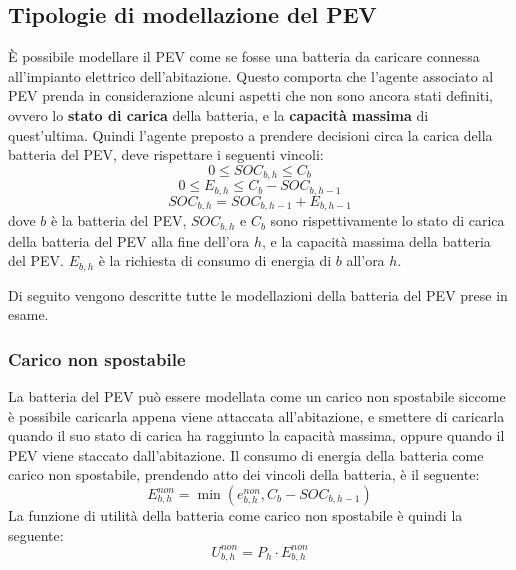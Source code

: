 \documentclass[italian, Lau, oneside]{sapthesis}
\begin{document}
\subsection{Tipologie di modellazione del PEV}
\label{subsec:tipmod}
È possibile modellare il PEV come se fosse una batteria da caricare connessa all'impianto elettrico dell'abitazione. Questo comporta che l'agente associato al PEV prenda in considerazione alcuni aspetti che non sono ancora stati definiti, ovvero lo \textbf{stato di carica} della batteria, e la \textbf{capacità massima} di quest'ultima. Quindi l'agente preposto a prendere decisioni circa la carica della batteria del PEV, deve rispettare i seguenti vincoli:
\begin{equation}
\label{eq:vincolo1}
0 \leq SOC_{b,h} \leq C_b
\end{equation}
\begin{equation}
\label{eq:vincolo2}
0 \leq E_{b,h} \leq C_b - SOC_{b,h-1}
\end{equation}
\begin{equation}
\label{eq:vincolo3}
SOC_{b,h} = SOC_{b,h-1} + E_{b,h-1}
\end{equation}
dove $b$ è la batteria del PEV, $SOC_{b,h}$ e $C_b$ sono rispettivamente lo stato di carica della batteria del PEV alla fine dell'ora $h$, e la capacità massima della batteria del PEV. $E_{b,h}$ è la richiesta di consumo di energia di $b$ all'ora $h$.

Di seguito vengono descritte tutte le modellazioni della batteria del PEV prese in esame.

\subsubsection{Carico non spostabile}
La batteria del PEV può essere modellata come un carico non spostabile siccome è possibile caricarla appena viene attaccata all'abitazione, e smettere di caricarla quando il suo stato di carica ha raggiunto la capacità massima, oppure quando il PEV viene staccato dall'abitazione.
Il consumo di energia della batteria come carico non spostabile, prendendo atto dei vincoli della batteria, è il seguente:
\begin{equation}
E^{non}_{b,h} = \min(e^{non}_{b,h}, C_b - SOC_{b,h-1})
\end{equation}
La funzione di utilità della batteria come carico non spostabile è quindi la seguente:
\begin{equation}
U^{non}_{b,h} = P_h \cdot E^{non}_{b,h}
\end{equation}
\end{document}
